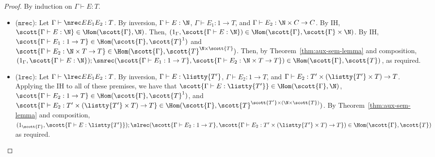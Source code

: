 \begin{proof}
By induction on $\Gamma \vdash E : T$.
\begin{itemize}
  \item ($\texttt{nrec}$): Let $\Gamma \vdash \nrec E {E_1} {E_2} : T$. By inversion, $\Gamma \vdash E : \N$, $\Gamma \vdash E_1 : 1 \to T$, and $\Gamma \vdash E_2 : \N \times C \to C$. By IH, $\scott{\Gamma \vdash E : \N} \in \Hom(\scott{\Gamma},\N)$. Then, $(1_{\Gamma},\scott{\Gamma \vdash E : \N}) \in \Hom(\scott{\Gamma},\scott{\Gamma}\times \N)$. By IH, $\scott{\Gamma \vdash E_1 : 1 \to T} \in \Hom(\scott{\Gamma},\scott{T}^1)$ and $\scott{\Gamma \vdash E_2 : \N \times T \to T} \in \Hom(\scott{\Gamma},\scott{T}^{\N \times \scott{T}})$. Then, by Theorem~\ref{thm:aux-sem-lemma} and composition, $(1_{\Gamma},\scott{\Gamma \vdash E : \N}) ; \snrec(\scott{\Gamma \vdash E_1 : 1 \to T},\scott{\Gamma \vdash E_2 : \N \times T \to T}) \in \Hom(\scott{\Gamma},\scott{T})$, as required.
  
  \item ($\texttt{lrec}$): Let $\Gamma \vdash \lrec E {E_1} {E_2} : T$. By inversion, $\Gamma \vdash E : \listty {T'}$, $\Gamma \vdash E_2 : 1 \to T$, and $\Gamma \vdash E_2 : T' \times (\listty {T'} \times T) \to T$. Applying the IH to all of these premises, we have that $\scott{\Gamma \vdash E : \listty {T'}} \in \Hom(\scott{\Gamma},\N)$, $\scott{\Gamma \vdash E_2 : 1 \to T} \in \Hom(\scott{\Gamma},\scott{T}^1)$, and $\scott{\Gamma \vdash E_2 : T' \times (\listty {T'} \times T) \to T} \in \Hom(\scott{\Gamma},\scott{T}^{\scott{T'}\times(\N\times\scott{T})})$. By Theorem~\ref{thm:aux-sem-lemma} and composition, $(1_{\scott{\Gamma}},\scott{\Gamma \vdash E : \listty {T'}}) ; \slrec(\scott{\Gamma \vdash E_2 : 1 \to T},\scott{\Gamma \vdash E_2 : T' \times (\listty {T'} \times T) \to T}) \in \Hom(\scott{\Gamma},\scott{T})$ as required.
\end{itemize}
\end{proof}
